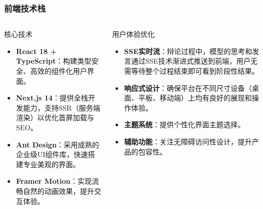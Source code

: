 \documentclass[aspectratio=169]{beamer} %
\begin{document}
\begin{frame}
\frametitle{前端技术栈}
\begin{columns}
\begin{column}{0.5\textwidth}
\begin{block}{核心技术}
\begin{itemize}
\item \textbf{React 18 + TypeScript}：构建类型安全、高效的组件化用户界面。
\item \textbf{Next.js 14}：提供全栈开发能力，支持SSR（服务端渲染）以优化首屏加载与SEO。
\item \textbf{Ant Design}：采用成熟的企业级UI组件库，快速搭建专业美观的界面。
\item \textbf{Framer Motion}：实现流畅自然的动画效果，提升交互体验。
\end{itemize}
\end{block}
\end{column}
\begin{column}{0.5\textwidth}
\begin{block}{用户体验优化}
\begin{itemize}
\item \textbf{SSE实时流}：辩论过程中，模型的思考和发言通过SSE技术渐进式推送到前端，用户无需等待整个过程结束即可看到阶段性结果。
\item \textbf{响应式设计}：确保平台在不同尺寸设备（桌面、平板、移动端）上均有良好的展现和操作体验。
\item \textbf{主题系统}：提供个性化界面主题选择。
\item \textbf{辅助功能}：关注无障碍访问性设计，提升产品的包容性。
\end{itemize}
\end{block}
\end{column}
\end{columns}
\end{frame}
\end{document}

